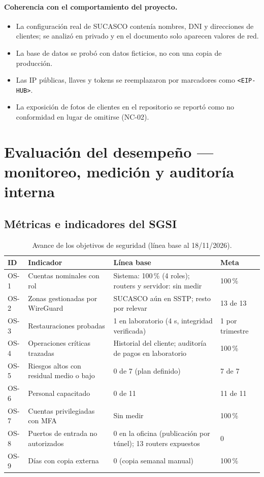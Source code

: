 \paragraph{Coherencia con el comportamiento del proyecto.}
\begin{itemize}
  \item La configuración real de SUCASCO contenía nombres, DNI y direcciones de clientes;
  se analizó en privado y en el documento solo aparecen valores de red.
  \item La base de datos se probó con datos ficticios, no con una copia de producción.
  \item Las IP públicas, llaves y tokens se reemplazaron por marcadores como
  \texttt{<EIP-HUB>}.
  \item La exposición de fotos de clientes en el repositorio se reportó como no conformidad
  en lugar de omitirse (NC-02).
\end{itemize}

\section{Evaluación del desempeño --- monitoreo, medición y auditoría interna}

\subsection{Métricas e indicadores del SGSI}

\begin{table}[H]
\centering
\caption{Avance de los objetivos de seguridad (línea base al 18/11/2026).}
\label{tab:ce03-sgsi-metricas}
\small
\begin{tabularx}{\textwidth}{L{0.9cm}XL{4.2cm}L{1.8cm}}
\toprule
\textbf{ID} & \textbf{Indicador} & \textbf{Línea base} & \textbf{Meta} \\
\midrule
OS-1 & Cuentas nominales con rol & Sistema: 100\,\% (4 roles); routers y servidor: sin medir & 100\,\% \\
OS-2 & Zonas gestionadas por WireGuard & SUCASCO aún en SSTP; resto por relevar & 13 de 13 \\
OS-3 & Restauraciones probadas & 1 en laboratorio (4 s, integridad verificada) & 1 por trimestre \\
OS-4 & Operaciones críticas trazadas & Historial del cliente; auditoría de pagos en laboratorio & 100\,\% \\
OS-5 & Riesgos altos con residual medio o bajo & 0 de 7 (plan definido) & 7 de 7 \\
OS-6 & Personal capacitado & 0 de 11 & 11 de 11 \\
OS-7 & Cuentas privilegiadas con MFA & Sin medir & 100\,\% \\
OS-8 & Puertos de entrada no autorizados & 0 en la oficina (publicación por túnel); 13 routers expuestos & 0 \\
OS-9 & Días con copia externa & 0 (copia semanal manual) & 100\,\% \\
\bottomrule
\end{tabularx}
\end{table}


